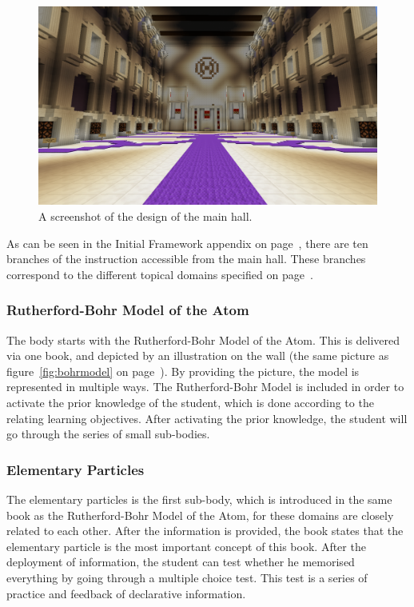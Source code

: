 \documentclass[11pt,twoside]{report} %
\begin{document}
\begin{figure}[h]
\centering
\includegraphics[width=\textwidth]{mainhall}
\caption{A screenshot of the design of the main hall.\label{fig:mainhall}}
\end{figure}

As can be seen in the Initial Framework appendix on page~\pageref{app:framework1}, there are ten branches of the instruction accessible from the main hall. These branches correspond to the different topical domains specified on page~\pageref{app:topicaldomains}.

\subsubsection{Rutherford-Bohr Model of the Atom}

The body starts with the Rutherford-Bohr Model of the Atom. This is delivered via one book, and depicted by an illustration on the wall (the same picture as figure~\ref{fig:bohrmodel} on page~\pageref{fig:bohrmodel}). By providing the picture, the model is represented in multiple ways. The Rutherford-Bohr Model is included in order to activate the prior knowledge of the student, which is done according to the relating learning objectives. After activating the prior knowledge, the student will go through the series of small sub-bodies.

\subsubsection{Elementary Particles}

The elementary particles is the first sub-body, which is introduced in the same book as the Rutherford-Bohr Model of the Atom, for these domains are closely related to each other. After the information is provided, the book states that the elementary particle is the most important concept of this book. After the deployment of information, the student can test whether he memorised everything by going through a multiple choice test. This test is a series of practice and feedback of declarative information.
\end{document}
